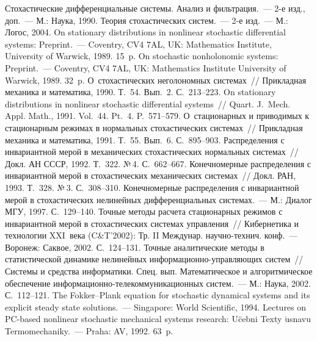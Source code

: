 \begin{multicols}{2}
{{\begin{thebibliography}{99}
      Стохастические дифференциальные 
сис\-те\-мы. Анализ и фильтрация.~--- 2-е изд., доп.~--- М.: Наука, 1990.
      Теория стохастических сис\-тем.~--- 
     2-е изд.~--- М.: Логос, 2004.
      On stationary distributions in nonlinear 
stochastic differential systems: Preprint.~--- Coventry, CV4 7AL, UK: Mathematics 
Institute, University of Warwick, 1989. 15~p. 
      On stochastic nonholonomic systems: 
Preprint.~--- Coventry, CV4 7AL, UK: Mathematics Institute University of Warwick, 
1989. 32~p. 
      О~стохастических неголономных 
сис\-те\-мах~// Прикладная механика и математика, 1990. Т.~54. Вып.~2. 
     С.~213--223.
      On stationary distributions in nonlinear 
stochastic differential systems~// Quart. J.~Mech. Appl. Math., 1991. Vol.~44. Pt.~4. 
P.~571--579.
      О~стационарных и приводимых к 
стационарным режимах в нормальных стохастических сис\-те\-мах~// Прикладная 
механика и математика, 1991. Т.~55. Вып.~6. С.~895--903.
      Распределения с инвариантной мерой 
в механических стохастических нормальных сис\-те\-мах~// Докл. АН СССР, 1992. 
Т.~322. №\,4. С.~662--667.
     Конечномерные распределения с инвариантной мерой в стохастических 
механических сис\-те\-мах~// Докл. РАН, 1993. Т.~328. №\,3. С.~308--310.
      Конечномерные распределения с инвариантной 
мерой в стохастических нелинейных дифференциальных сис\-те\-мах.~--- М.: 
Диалог МГУ, 1997. С.~129--140.
      Точные методы 
рас\-че\-та стационарных режимов с инвариантной мерой в стохастических 
сис\-те\-мах управ\-ле\-ния~// Кибернетика и технологии XXI~века (C\&T'2002): Тр. 
II Междунар. научно-технич. конф.~--- Воронеж: Саквое, 2002. С.~124--131.
      Точные 
аналитические методы в статистической динамике нелинейных 
ин\-фор\-ма\-ци\-он\-но-управ\-ля\-ющих сис\-тем~// Сис\-те\-мы и средства информатики. 
Спец. вып. Математическое и алгоритмическое обеспечение 
     ин\-фор\-ма\-ци\-он\-но-те\-ле\-ком\-му\-ни\-ка\-ци\-он\-ных сис\-тем.~--- 
М.: Наука, 2002. С.~112--121.
      The Fokker--Plank equation for stochastic dynamical systems 
and its explicit steady state solutions.~--- Singapore: World Scientific, 1994.
      Lectures on PC-based nonlinear stochastic mechanical 
systems research: U$\hat{\mbox{c}}$ebni Texty $\acute{\mbox{u}}$snavu 
Termomechaniky.~--- Praha: {}AV, 1992. 63~p.


\end{thebibliography}}}
\end{multicols}

